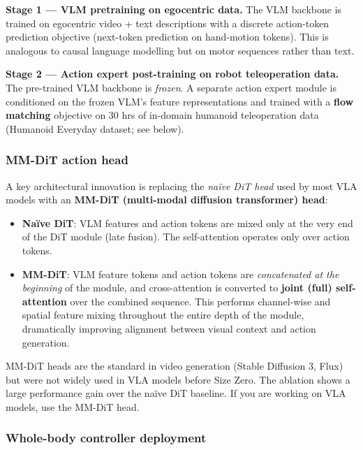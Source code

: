 \textbf{Stage 1 — VLM pretraining on egocentric data.}
The VLM backbone is trained on egocentric video + text descriptions with a discrete action-token prediction objective (next-token prediction on hand-motion tokens). This is analogous to causal language modelling but on motor sequences rather than text.

\textbf{Stage 2 — Action expert post-training on robot teleoperation data.}
The pre-trained VLM backbone is \emph{frozen}. A separate action expert module is conditioned on the frozen VLM's feature representations and trained with a \textbf{flow matching} objective on 30 hrs of in-domain humanoid teleoperation data (Humanoid Everyday dataset; see below).

\subsubsection{MM-DiT action head}

A key architectural innovation is replacing the \emph{naïve DiT head} used by most VLA models with an \textbf{MM-DiT (multi-modal diffusion transformer) head}:

\begin{itemize}
  \item \textbf{Naïve DiT}: VLM features and action tokens are mixed only at the very end of the DiT module (late fusion). The self-attention operates only over action tokens.
  \item \textbf{MM-DiT}: VLM feature tokens and action tokens are \emph{concatenated at the beginning} of the module, and cross-attention is converted to \textbf{joint (full) self-attention} over the combined sequence. This performs channel-wise and spatial feature mixing throughout the entire depth of the module, dramatically improving alignment between visual context and action generation.
\end{itemize}

\begin{paperbox}[title={MM-DiT head recommendation}]
MM-DiT heads are the standard in video generation (Stable Diffusion 3, Flux) but were not widely used in VLA models before Size Zero. The ablation shows a large performance gain over the naïve DiT baseline. If you are working on VLA models, use the MM-DiT head.
\end{paperbox}

\subsubsection{Whole-body controller deployment}

